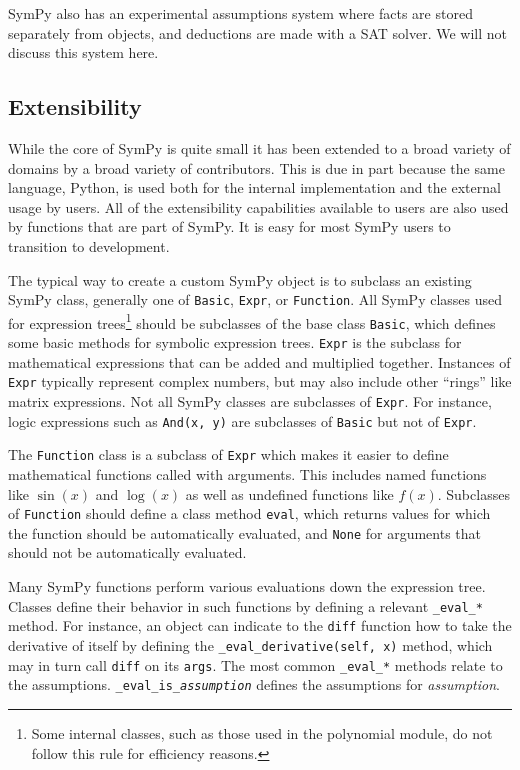 SymPy also has an experimental assumptions system where facts are stored
separately from objects, and deductions are made with a SAT solver. We will not
discuss this system here.


\subsection{Extensibility}

While the core of SymPy is quite small it has been extended to a broad variety
of domains by a broad variety of contributors.  This is due in part because the
same language, Python, is used both for the internal implementation and the
external usage by users.  All of the extensibility capabilities available to
users are also used by functions that are part of SymPy.  It is easy for most
SymPy users to transition to development.

The typical way to create a custom SymPy object is to subclass an existing
SymPy class, generally one of \texttt{Basic}, \texttt{Expr}, or
\texttt{Function}. All SymPy classes used for expression trees\footnote{Some
  internal classes, such as those used in the polynomial module, do not follow
  this rule for efficiency reasons.} should be subclasses of the base class
\texttt{Basic}, which defines some basic methods for symbolic expression
trees. \texttt{Expr} is the subclass for mathematical expressions that can be
added and multiplied together. Instances of \texttt{Expr} typically represent
complex numbers, but may also include other ``rings'' like matrix expressions.
Not all SymPy classes are subclasses of \texttt{Expr}. For instance, logic expressions such
as \verb|And(x, y)| are subclasses of \texttt{Basic} but not of \texttt{Expr}.

The \texttt{Function} class is a subclass of \texttt{Expr} which makes it
easier to define mathematical functions called with arguments. This includes
named functions like $\sin(x)$ and $\log(x)$ as well as undefined functions
like $f(x)$. Subclasses of \texttt{Function} should define a
class method \texttt{eval}, which returns values for which the function should
be automatically evaluated, and \texttt{None} for arguments that should not be
automatically evaluated.

Many SymPy functions perform various evaluations down the expression tree.
Classes define their behavior in such functions by defining a relevant
\verb|_eval_|\texttt{\textit{*}} method. For instance, an object can indicate
to the \texttt{diff} function how to take the derivative of itself by defining
the \verb|_eval_derivative(self, x)| method, which may in turn call
\texttt{diff} on its \texttt{args}. The most common
\verb|_eval_|\texttt{\textit{*}} methods relate to the assumptions.
\verb|_eval_is_|\texttt{\textit{assumption}} defines the assumptions for
\textit{assumption}.

